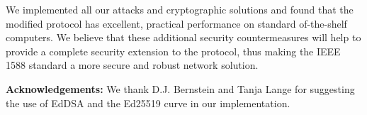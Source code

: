 \documentclass[11pt]{article}
\begin{document}
We implemented all our attacks and cryptographic solutions and found that the modified protocol has excellent, practical performance on standard of-the-shelf computers. We believe that these additional security countermeasures will help to provide a complete security extension to the protocol, thus making the IEEE 1588 standard a more secure and robust network solution.







\textbf{Acknowledgements:} We thank D.J. Bernstein and Tanja Lange for suggesting the use of EdDSA and the Ed25519 curve in our implementation.







\newpage



\renewcommand{\theequation}{A-\arabic{equation}}



\setcounter{equation}{0}  

\setcounter{figure}{0}  











{}
\end{document}
